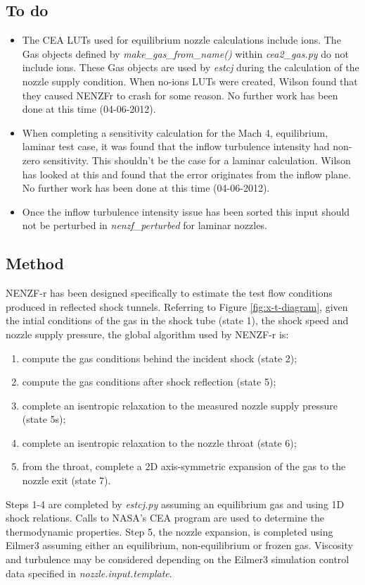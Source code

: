 \subsection{To do}
\label{nenzfr_to_do}
\begin{itemize}
\item The CEA LUTs used for equilibrium nozzle calculations include ions. The Gas objects defined by \textit{make\_gas\_from\_name()} within \textit{cea2\_gas.py} do not include ions. These Gas objects are used by \textit{estcj} during the calculation of the nozzle supply condition. When no-ions LUTs were created, Wilson found that they caused NENZFr to crash for some reason. No further work has been done at this time (04-06-2012).
\item When completing a sensitivity calculation for the Mach 4, equilibrium, laminar test case, it was found that the inflow turbulence intensity had non-zero sensitivity. This shouldn't be the case for a laminar calculation. Wilson has looked at this and found that the error originates from the inflow plane. No further work has been done at this time (04-06-2012).
\item Once the inflow turbulence intensity issue has been sorted this input should not be perturbed in \textit{nenzf\_perturbed} for laminar nozzles.
\end{itemize}

\subsection{Method}
NENZF-r has been designed specifically to estimate the test flow conditions produced in reflected shock tunnels. Referring to Figure \ref{fig:x-t-diagram}, given the intial conditions of the gas in the shock tube (state 1), the shock speed and nozzle supply pressure, the global algorithm used by NENZF-r is:
\begin{enumerate}
\item compute the gas conditions behind the incident shock (state 2);
\item compute the gas conditions after shock reflection (state 5);
\item complete an isentropic relaxation to the measured nozzle supply pressure (state 5s);
\item complete an isentropic relaxation to the nozzle throat (state 6);
\item from the throat, complete a 2D axis-symmetric expansion of the gas to the nozzle exit (state 7).
\end{enumerate}
Steps 1-4 are completed by \textit{estcj.py} assuming an equilibrium gas and using 1D shock relations. Calls to NASA's CEA \cite{Gordon_1994} program are used to determine the thermodynamic properties. Step 5, the nozzle expansion, is completed using Eilmer3 assuming either an equilibrium, non-equilibrium or frozen gas. Viscosity and turbulence may be considered depending on the Eilmer3 simulation control data specified in \textit{nozzle.input.template}. 


